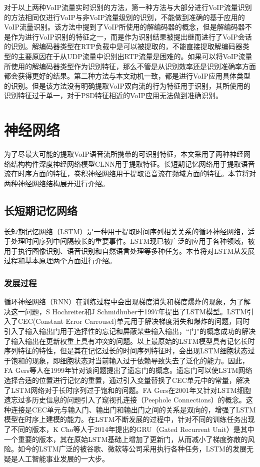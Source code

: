 对于以上两种VoIP流量实时识别的方法，第一种方法与大部分进行VoIP流量识别的方法相同仅进行VoIP与非VoIP流量级别的识别，不能做到准确的基于应用的VoIP流量识别。该方法中提到了VoIP所使用的解编码器的概念，但是解编码器不是作为进行VoIP识别的特征之一，而是作为识别结果被提出继而进行了VoIP会话的识别。解编码器类型在RTP负载中是可以被提取的，不能直接提取解编码器类型的主要原因在于从UDP流量中识别出RTP流量是困难的。如果可以将VoIP流量所使用的解编码器类型作为识别特征，那么不管是从识别效率还是识别准确率方面都会获得更好的结果。第二种方法与本文动机一致，都是进行VoIP应用具体类型的识别。但是该方法没有明确提取VoIP双向流的行为特征用于识别，其所使用的识别特征过于单一，对于PSD特征相近的VoIP应用无法做到准确识别。






\section{神经网络}
为了尽最大可能的提取VoIP语音流所携带的可识别特征，本文采用了两种神经网络结构构件深度神经网络模型CLNN用于提取特征。长短期记忆网络用于提取语音流在时序方面的特征，卷积神经网络用于提取语音流在频域方面的特征。本节将对两种神经网络结构展开进行介绍。
\subsection{长短期记忆网络}
长短期记忆网络（LSTM）是一种用于提取时间序列相关关系的循环神经网络，适于处理时间序列中间隔较长的重要事件。LSTM现已被广泛的应用于各种领域，被用于执行图像识别、语音识别和自然语言处理等多种任务。本节将对LSTM从发展过程和基本原理两个方面进行介绍。
\subsubsection{发展过程}
循环神经网络（RNN）在训练过程中会出现梯度消失和梯度爆炸的现象，为了解决这一问题，S Hochreiter和J Schmidhuber于1997年提出了LSTM模型\supercite{lstm}。LSTM引入了CEC(Constant Error Carrousel)单元用于解决梯度消失和爆炸的问题，同时引入了输入输出门用于选择性的忘记和屏蔽某些输入输出，“门”的概念成功的解决了输入输出在更新权重上具有冲突的问题。以上最原始的LSTM模型具有记忆长时序列特征的特性，但是其在记忆过长的时间序列特征时，会出现LSTM细胞状态过于饱和的现象，即细胞状态对当前输入过于依赖导致失去了泛化的能力。因此，FA Gers等人在1999年针对该问题提出了遗忘门的概念\supercite{lstmforgetgate}。遗忘门可以使LSTM网络选择合适的位置进行记忆的重置，通过引入变量替换了CEC单元中的常量，解决了LSTM网络对于长时序列过于饱和的问题。FA Gers在2001年又针对LSTM细胞遗忘过多历史信息的问题引入了窥视孔连接（Peephole Connections）的概念\supercite{lstmpeephole}。这种连接是CEC单元与输入门、输出门和输出门之间的关系是双向的，增强了LSTM模型在时序上建模的能力。在LSTM不断发展的过程中，针对不同的训练任务出现了不同的版本，K Cho等人于2014年提出的GRU（Gated Recurrent Unit）是其中一个重要的版本，其在原始LSTM基础上增加了更新门，从而减小了梯度弥散的风险。如今的LSTM广泛的被谷歌、微软等公司采用执行各种任务，LSTM的发展无疑是人工智能事业发展的一大步。


